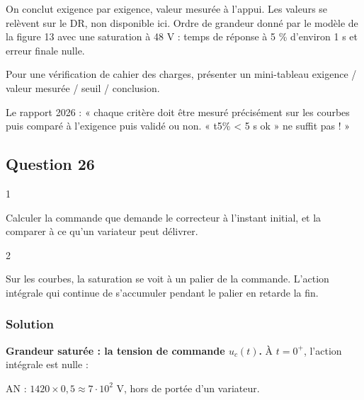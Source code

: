 \documentclass[11pt,a4paper]{article}
\newcommand{\equationajustee}[1]{%
  \sbox{\boiteequation}{$\displaystyle #1$}%
  \ifdim\wd\boiteequation>\linewidth
    \[\resizebox{\linewidth}{!}{\usebox{\boiteequation}}\]%
  \else
    \[#1\]%
  \fi}
\begin{document}
On conclut exigence par exigence, valeur mesurée à l'appui. Les valeurs se relèvent sur le DR, non disponible ici. Ordre de grandeur donné par le modèle de la figure 13 avec une saturation à 48 V : temps de réponse à 5 \% d'environ 1 s et erreur finale nulle.

\begin{methode}

Pour une vérification de cahier des charges, présenter un mini-tableau exigence / valeur mesurée / seuil / conclusion.

\end{methode}

\begin{jury}

Le rapport 2026 : « chaque critère doit être mesuré précisément sur les courbes puis comparé à l'exigence puis validé ou non. « t5\% \textless{} 5 s ok » ne suffit pas ! »

\end{jury}

\hypertarget{question-26}{%
\subsection{Question 26}\label{question-26}}

\begin{indication}{1}

Calculer la commande que demande le correcteur à l'instant initial, et la comparer à ce qu'un variateur peut délivrer.

\end{indication}

\begin{indication}{2}

Sur les courbes, la saturation se voit à un palier de la commande. L'action intégrale qui continue de s'accumuler pendant le palier en retarde la fin.

\end{indication}

\hypertarget{solution-25}{%
\subsubsection{Solution}\label{solution-25}}

\textbf{Grandeur saturée : la tension de commande \(u_c(t)\).} À \(t=0^+\), l'action intégrale est nulle :

\equationajustee{u_c(0^+)=K_P\,\varepsilon'(0^+)}

AN : \(1420\times0{,}5\approx7\cdot10^2\) V, hors de portée d'un variateur.
\end{document}
